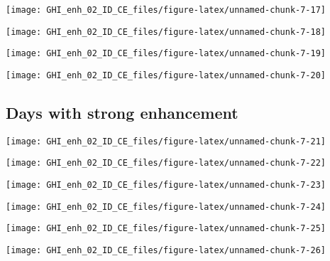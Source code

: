 \documentclass[
  10pt,
  a4paper,oneside]{article}
\begin{document}
\begin{center}\texttt{[image: GHI\_enh\_02\_ID\_CE\_files/figure-latex/unnamed-chunk-7-17]} \end{center}

\begin{center}\texttt{[image: GHI\_enh\_02\_ID\_CE\_files/figure-latex/unnamed-chunk-7-18]} \end{center}

\begin{center}\texttt{[image: GHI\_enh\_02\_ID\_CE\_files/figure-latex/unnamed-chunk-7-19]} \end{center}

\begin{center}\texttt{[image: GHI\_enh\_02\_ID\_CE\_files/figure-latex/unnamed-chunk-7-20]} \end{center}

\hypertarget{days-with-strong-enhancement}{%
\subsection{Days with strong enhancement}\label{days-with-strong-enhancement}}

\begin{center}\texttt{[image: GHI\_enh\_02\_ID\_CE\_files/figure-latex/unnamed-chunk-7-21]} \end{center}

\begin{center}\texttt{[image: GHI\_enh\_02\_ID\_CE\_files/figure-latex/unnamed-chunk-7-22]} \end{center}

\begin{center}\texttt{[image: GHI\_enh\_02\_ID\_CE\_files/figure-latex/unnamed-chunk-7-23]} \end{center}

\begin{center}\texttt{[image: GHI\_enh\_02\_ID\_CE\_files/figure-latex/unnamed-chunk-7-24]} \end{center}

\begin{center}\texttt{[image: GHI\_enh\_02\_ID\_CE\_files/figure-latex/unnamed-chunk-7-25]} \end{center}

\begin{center}\texttt{[image: GHI\_enh\_02\_ID\_CE\_files/figure-latex/unnamed-chunk-7-26]} \end{center}
\end{document}
